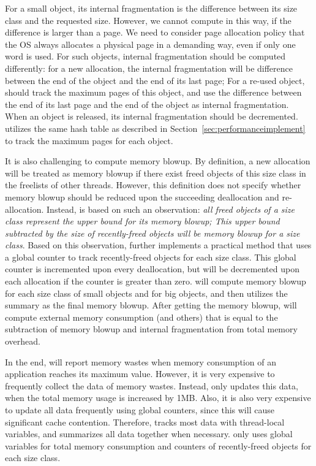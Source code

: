 For a small object, its internal fragmentation is the difference between its size class and the requested size. However, we cannot compute in this way, if the difference is larger than a page. We need to consider page allocation policy that the OS always allocates a physical page in a demanding way, even if only one word is used. For such objects, internal fragmentation should be computed differently: for a new allocation, the internal fragmentation will be difference between the end of the object and the end of its last page; For a re-used object, \MP{} should track the maximum pages of this object, and use the difference between the end of its last page and the end of the object as internal fragmentation. When an object is released, its internal fragmentation should be decremented. \MP{} utilizes the same hash table as described in Section~\ref{sec:performanceimplement} to track the maximum pages for each object. 

It is also challenging to compute memory blowup. By definition, a new allocation will be treated as memory blowup if there exist freed objects of this size class in the freelists of other threads. However, this definition does not specify whether memory blowup should be reduced upon the succeeding deallocation and re-allocation. Instead, \MP{} is based on such an observation: \textit{all freed objects of a size class represent the upper bound for its memory blowup; This upper bound subtracted by the size of recently-freed objects will be memory blowup for a size class}. Based on this observation, \MP{} further implements a practical method that uses a global counter to track recently-freed objects for each size class. This global counter is incremented upon every deallocation, but will be decremented upon each allocation if the counter is greater than zero. \MP{} will compute memory blowup for each size class of small objects and for big objects, and then utilizes the summary as the final memory blowup. After getting the memory blowup, \MP{} will compute external memory consumption (and others) that is equal to the subtraction of memory blowup and internal fragmentation from total memory overhead.


In the end, \MP{} will report memory wastes when memory consumption of an application reaches its maximum value. However, it is very expensive to frequently collect the data of memory wastes. Instead, \MP{} only updates this data, when the total memory usage is increased by 1MB. Also, it is also very expensive to update all data frequently using global counters, since this will cause significant cache contention. Therefore, \MP{} tracks most data with thread-local variables, and summarizes all data together when necessary. \MP{} only uses global variables for total memory consumption and counters of recently-freed objects for each size class. 

